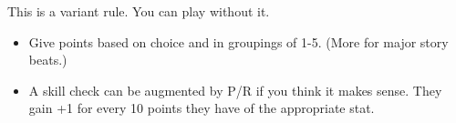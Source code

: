\begin{scifitablebox}[screenbox,title=\textcolor{PanelGlow}{Paragon \& Renegade}]
This is a variant rule. You can play without it.
\begin{itemize}
  \item Give points based on choice and in groupings of 1-5. (More for major story beats.)
  \item A skill check can be augmented by P/R if you think it makes sense. They gain +1 for every 10 points they have of the appropriate stat.
\end{itemize}
\end{scifitablebox}